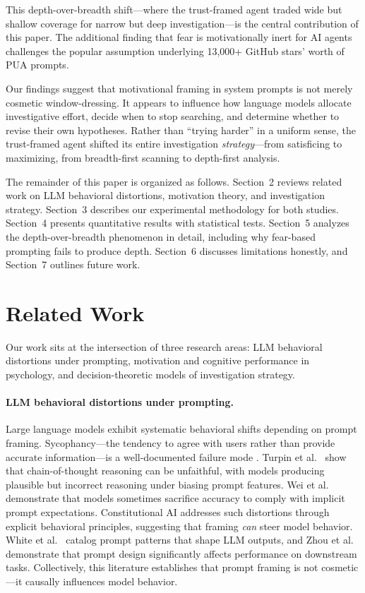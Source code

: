 \documentclass[11pt]{article}
\begin{document}
This depth-over-breadth shift---where the trust-framed agent traded wide but shallow coverage for narrow but deep investigation---is the central contribution of this paper. The additional finding that fear is motivationally inert for AI agents challenges the popular assumption underlying 13{,}000+ GitHub stars' worth of PUA prompts.

Our findings suggest that motivational framing in system prompts is not merely cosmetic window-dressing. It appears to influence how language models allocate investigative effort, decide when to stop searching, and determine whether to revise their own hypotheses. Rather than ``trying harder'' in a uniform sense, the trust-framed agent shifted its entire investigation \emph{strategy}---from satisficing \cite{simon1956rational} to maximizing, from breadth-first scanning to depth-first analysis.

The remainder of this paper is organized as follows. Section~2 reviews related work on LLM behavioral distortions, motivation theory, and investigation strategy. Section~3 describes our experimental methodology for both studies. Section~4 presents quantitative results with statistical tests. Section~5 analyzes the depth-over-breadth phenomenon in detail, including why fear-based prompting fails to produce depth. Section~6 discusses limitations honestly, and Section~7 outlines future work.

\section{Related Work}

Our work sits at the intersection of three research areas: LLM behavioral distortions under prompting, motivation and cognitive performance in psychology, and decision-theoretic models of investigation strategy.

\paragraph{LLM behavioral distortions under prompting.}
Large language models exhibit systematic behavioral shifts depending on prompt framing. Sycophancy---the tendency to agree with users rather than provide accurate information---is a well-documented failure mode \cite{sharma2023sycophancy}. Turpin et al.\  show that chain-of-thought reasoning can be unfaithful, with models producing plausible but incorrect reasoning under biasing prompt features. Wei et al.\  demonstrate that models sometimes sacrifice accuracy to comply with implicit prompt expectations. Constitutional AI \cite{bai2022constitutional} addresses such distortions through explicit behavioral principles, suggesting that framing \emph{can} steer model behavior. White et al.\  catalog prompt patterns that shape LLM outputs, and Zhou et al.\  demonstrate that prompt design significantly affects performance on downstream tasks. Collectively, this literature establishes that prompt framing is not cosmetic---it causally influences model behavior.
\end{document}
